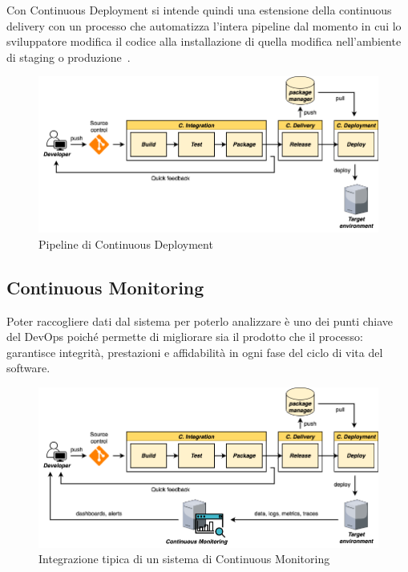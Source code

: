 Con Continuous Deployment si intende quindi una estensione della continuous delivery con un processo che automatizza l'intera pipeline dal momento in cui lo sviluppatore modifica il codice alla installazione di quella modifica nell'ambiente di staging o produzione~\cite{krief2019learning}.

\begin{figure}[H]
    \centering
    \includegraphics[width=1\textwidth]{img/cdeploy-pipeline.png}
    \caption{Pipeline di Continuous Deployment}
    \label{cdeploy-pipeline}
\end{figure}

\subsection{Continuous Monitoring}
Poter raccogliere dati dal sistema per poterlo analizzare è uno dei punti chiave del DevOps poiché permette di migliorare sia il prodotto che il processo: garantisce integrità, prestazioni e affidabilità in ogni fase del ciclo di vita del software.

\begin{figure}[H]
    \centering
    \includegraphics[width=1\textwidth]{img/ci-monitoring.png}
    \caption{Integrazione tipica di un sistema di Continuous Monitoring}
    \label{ci-monitoring}
\end{figure}

